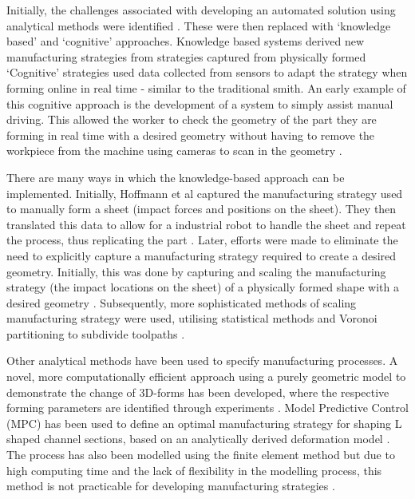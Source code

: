 Initially, the challenges associated with developing an automated solution using analytical methods were identified \citep{Golle2007DrivingProducts}. These were then replaced with `knowledge based' and `cognitive' approaches. Knowledge based systems derived new manufacturing strategies from strategies captured from physically formed %
`Cognitive' strategies used data collected from sensors to adapt the strategy when forming online in real time - similar to the traditional smith. An early example of this cognitive approach is the development of a system to simply assist manual driving. This allowed the worker to check the geometry of the part they are forming in real time with a desired geometry without having to remove the workpiece from the machine using cameras to scan in the geometry \citep{Scherer2010DrivingProducts}.

There are many ways in which the knowledge-based approach can be implemented. Initially, Hoffmann et al captured the manufacturing strategy used to manually form a sheet (impact forces and positions on the sheet). They then translated this data to allow for a industrial robot to handle the sheet and repeat the process, thus replicating the part  \citep{Hoffman2009AnHandling}. %
Later, efforts were made to eliminate the need to explicitly capture a manufacturing strategy required to create a desired geometry. Initially, this was done by capturing and scaling the manufacturing strategy (the impact locations on the sheet) of a physically formed shape with a desired geometry \citep{Opritescu2012AutomatedStrategy}. %
Subsequently, more sophisticated methods of scaling manufacturing strategy were used, utilising statistical methods \citep{Opritescu2016VariationVariance}  and Voronoi partitioning to subdivide toolpaths \citep{Hartmann2019Knowledge-basedPartitioning}. %

Other analytical methods have been used to specify manufacturing processes. A novel, more computationally efficient approach using a purely geometric model to demonstrate the change of 3D-forms has been developed, where the respective forming parameters are identified through experiments \citep{Yang2011GeometricalProcess}. Model Predictive Control (MPC) has been used to define an optimal manufacturing strategy for shaping L shaped channel sections, based on an analytically derived deformation model \citep{Yang2009AutomatisierungProgramming}. The process has also been modelled using the finite element method \citep{Hoffmann2005StudiesMetal} but due to high computing time and the lack of flexibility in the modelling process, this method is not practicable for developing manufacturing strategies \citep{Scherer2013MethodenBlechumformung}. %

